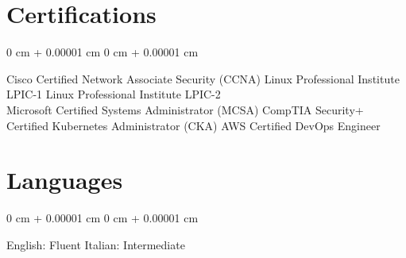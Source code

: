 \documentclass[10pt, letterpaper]{article}
\newenvironment{onecolentry}{
    \begin{adjustwidth}{
        0 cm + 0.00001 cm
    }{
        0 cm + 0.00001 cm
    }
}{
    \end{adjustwidth}
} %
\begin{document}
            \section{Certifications}
                \begin{onecolentry}
                    Cisco Certified Network Associate Security (CCNA) \;\;\; \textbullet\; Linux Professional Institute LPIC-1 \;\;\; \textbullet\; Linux Professional Institute LPIC-2 \\
                    Microsoft Certified Systems Administrator (MCSA) \;\;\; \textbullet\; CompTIA Security+ \;\;\; \textbullet\; Certified Kubernetes Administrator (CKA) \;\;\; \textbullet\; AWS Certified DevOps Engineer
                \end{onecolentry}

            \section{Languages}
                \begin{onecolentry}
                    English: Fluent \;\;\; \textbullet\; Italian: Intermediate
                \end{onecolentry}

        
\end{document}
